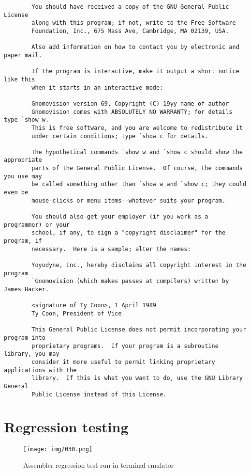 \documentclass[a4paper,twoside,12pt]{book}
\begin{document}
{\begin{verbatim}
		You should have received a copy of the GNU General Public License
		along with this program; if not, write to the Free Software
		Foundation, Inc., 675 Mass Ave, Cambridge, MA 02139, USA.

		Also add information on how to contact you by electronic and paper mail.

		If the program is interactive, make it output a short notice like this
		when it starts in an interactive mode:

		Gnomovision version 69, Copyright (C) 19yy name of author
		Gnomovision comes with ABSOLUTELY NO WARRANTY; for details type `show w.
		This is free software, and you are welcome to redistribute it
		under certain conditions; type `show c for details.

		The hypothetical commands `show w and `show c should show the appropriate
		parts of the General Public License.  Of course, the commands you use may
		be called something other than `show w and `show c; they could even be
		mouse-clicks or menu items--whatever suits your program.

		You should also get your employer (if you work as a programmer) or your
		school, if any, to sign a "copyright disclaimer" for the program, if
		necessary.  Here is a sample; alter the names:

		Yoyodyne, Inc., hereby disclaims all copyright interest in the program
		`Gnomovision (which makes passes at compilers) written by James Hacker.

		<signature of Ty Coon>, 1 April 1989
		Ty Coon, President of Vice

		This General Public License does not permit incorporating your program into
		proprietary programs.  If your program is a subroutine library, you may
		consider it more useful to permit linking proprietary applications with the
		library.  If this is what you want to do, use the GNU Library General
		Public License instead of this License.
	\end{verbatim}
	}
\onecolumn

\chapter{Regression testing}
	\begin{wrapfigure}{r}{180pt}
		\centering{}
		\texttt{[image: img/030.png]}
		\caption{Assembler regression test run in terminal emulator}
	\end{wrapfigure}
\end{document}
